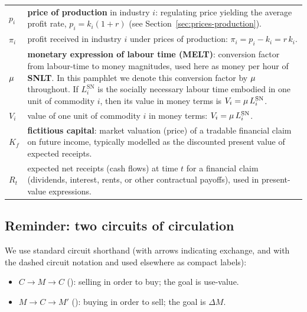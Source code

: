 \begin{longtable}{@{}>{\centering\arraybackslash}p{}@{\hspace{8pt}}%
                  >{\raggedright\arraybackslash}p{}@{}}
$p_i$ &
\textbf{price of production} in industry $i$: regulating price yielding the average profit rate, $p_i = k_i(1+r)$ (see Section~\ref{sec:prices-production}). \\

$\pi_i$ &
profit received in industry $i$ under prices of production: $\pi_i = p_i - k_i = r\,k_i$. \\

$\mu$ &
\textbf{monetary expression of labour time (MELT)}: conversion factor from labour-time to money magnitudes, used here as money per hour of \textbf{SNLT}. In this pamphlet we denote this conversion factor by $\mu$ throughout. If $L^{\mathrm{SN}}_i$ is the socially necessary labour time embodied in one unit of commodity $i$, then its value in money terms is $V_i = \mu\,L^{\mathrm{SN}}_i$. \\

$V_i$ &
value of one unit of commodity $i$ in money terms: $V_i = \mu\,L^{\mathrm{SN}}_i$. \\

$K_f$ &
\textbf{fictitious capital}: market valuation (price) of a tradable financial claim on future income, typically modelled as the discounted present value of expected receipts. \\

$R_t$ &
expected net receipts (cash flows) at time $t$ for a financial claim (dividends, interest, rents, or other contractual payoffs), used in present-value expressions. \\

\end{longtable}
\endgroup

\subsection*{Reminder: two circuits of circulation}

We use standard circuit shorthand (with arrows indicating exchange, and with the dashed circuit notation \CMC{} and \MCM{} used elsewhere as compact labels):

\begin{itemize}[leftmargin=1.5em]
  \item $C \rightarrow M \rightarrow C$ (\CMC): selling in order to buy; the goal is use-value.
  \item $M \rightarrow C \rightarrow M'$ (\MCM): buying in order to sell; the goal is $\Delta M$.
\end{itemize}
